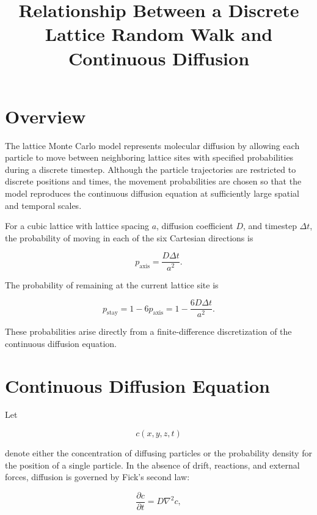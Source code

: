 \documentclass[11pt]{article}
\title{Relationship Between a Discrete Lattice Random Walk and Continuous Diffusion}
\author{}
\date{}
\begin{document}
\maketitle

\section{Overview}

The lattice Monte Carlo model represents molecular diffusion by allowing each particle to move between neighboring lattice sites with specified probabilities during a discrete timestep. Although the particle trajectories are restricted to discrete positions and times, the movement probabilities are chosen so that the model reproduces the continuous diffusion equation at sufficiently large spatial and temporal scales.

For a cubic lattice with lattice spacing \(a\), diffusion coefficient \(D\), and timestep \(\Delta t\), the probability of moving in each of the six Cartesian directions is

\begin{equation}
    p_{\mathrm{axis}}
    =
    \frac{D\Delta t}{a^2}.
\end{equation}

The probability of remaining at the current lattice site is

\begin{equation}
    p_{\mathrm{stay}}
    =
    1 - 6p_{\mathrm{axis}}
    =
    1-\frac{6D\Delta t}{a^2}.
\end{equation}

These probabilities arise directly from a finite-difference discretization of the continuous diffusion equation.

\section{Continuous Diffusion Equation}

Let

\begin{equation}
    c(x,y,z,t)
\end{equation}

denote either the concentration of diffusing particles or the probability density for the position of a single particle. In the absence of drift, reactions, and external forces, diffusion is governed by Fick's second law:

\begin{equation}
    \frac{\partial c}{\partial t}
    =
    D\nabla^2 c,
\end{equation}
\end{document}
